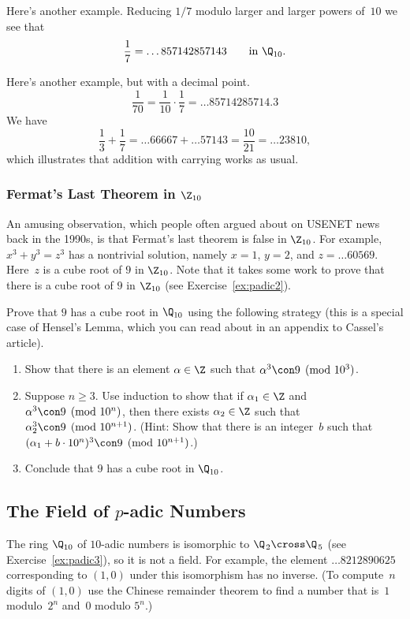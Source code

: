 \documentclass[11pt]{book}
\begin{document}
\begin{ch}
Here's another example.  Reducing $1/7$ modulo larger and larger powers of~$10$ we
see that
$$
 \frac{1}{7} = \ldots857142857143\qquad\text{in $\Q_{10}$}.
$$

Here's another example, but with a decimal point.
$$
\frac{1}{70} = \frac{1}{10}\cdot \frac{1}{7} = \ldots85714285714.3
$$
We have
$$\frac{1}{3} + \frac{1}{7} =
   \ldots66667 + \ldots57143 = \frac{10}{21} = \ldots 23810,
$$
which illustrates that addition with carrying works as usual.

\subsubsection{Fermat's Last Theorem in $\Z_{10}$}
An amusing observation, which people often argued about
on USENET news back
in the 1990s, is that Fermat's last theorem
is false in $\Z_{10}$. For example, $x^3 + y^3 = z^3$ has a nontrivial solution, namely
$x = 1$, $y=2$, and $z=\ldots60569$.   Here~$z$ is a cube
root of $9$ in $\Z_{10}$.  Note that it takes some work to prove that there
is a cube root of $9$ in $\Z_{10}$ (see Exercise~\ref{ex:padic2}).

\begin{exercise} \label{ex:topology6}
  Prove that $9$ has a cube root in $\Q_{10}$ using the following
  strategy (this is a special case of Hensel's Lemma, which you can
  read about in an appendix to Cassel's article).

\begin{enumerate}
\item Show that there is an element $\alpha\in\Z$ such that $\alpha^3\con 9\pmod{10^3}$.
\item Suppose $n\geq 3$.
Use induction to show that if $\alpha_1\in\Z$ and
$\alpha^3\con 9\pmod{10^n}$,  then there exists $\alpha_2\in\Z$ such
that $\alpha_2^3\con 9\pmod{10^{n+1}}$.
(Hint: Show that there is an integer~$b$ such that
$(\alpha_1 + b\cdot 10^{n})^3 \con 9\pmod{10^{n+1}}$.)
\item Conclude that $9$ has a cube root in $\Q_{10}$.
\end{enumerate}
\end{exercise}



\subsection{The Field of $p$-adic Numbers}
The ring $\Q_{10}$ of $10$-adic numbers is isomorphic to
$\Q_{\hspace{.2ex}2}\cross\Q_{\hspace{.2ex}5}$ (see Exercise~\ref{ex:padic3}), so it is not a
field.  For example, the element $\ldots8212890625$ corresponding to
$(1,0)$ under this isomorphism has no inverse.  (To compute~$n$ digits
of $(1,0)$ use the Chinese remainder theorem to find a number that
is~$1$ modulo~$2^{n}$ and~$0$ modulo $5^n$.)


\end{ch}
\end{document}
